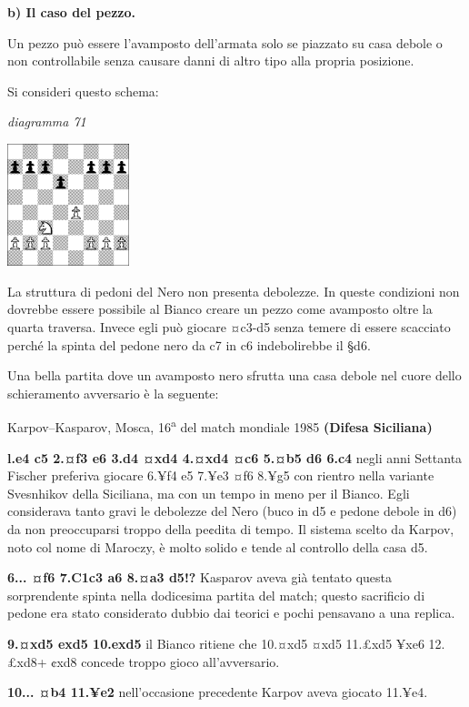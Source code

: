 \documentclass[
]{article}
\begin{document}
\textbf{b) Il caso del pezzo.}

Un pezzo può essere l'avamposto dell'armata solo se piazzato su casa
debole o non controllabile senza causare danni di altro tipo alla
propria posizione.

Si consideri questo schema:

\emph{diagramma 71}

\includegraphics[width=1.39792in,height=1.39792in]{vertopal_109f12be458a423d8f3cc838880eaea2/media/image71.png}

La struttura di pedoni del Nero non presenta debolezze. In queste
condizioni non dovrebbe essere possibile al Bianco creare un pezzo come
avamposto oltre la quarta traversa. Invece egli può giocare ¤c3-d5 senza
temere di essere scacciato perché la spinta del pedone nero da c7 in c6
indebolirebbe il §d6.

Una bella partita dove un avamposto nero sfrutta una casa debole nel
cuore dello schieramento avversario è la seguente:

Karpov--Kasparov, Mosca, 16\textsuperscript{a} del match mondiale 1985
\textbf{(Difesa Siciliana)}

\textbf{l.e4 c5 2.¤f3 e6 3.d4 ¤xd4 4.¤xd4 ¤c6 5.¤b5 d6 6.c4} negli anni
Settanta Fischer preferiva giocare 6.¥f4 e5 7.¥e3 ¤f6 8.¥g5 con rientro
nella variante Svesnhikov della Siciliana, ma con un tempo in meno per
il Bianco. Egli considerava tanto gravi le debolezze del Nero (buco in
d5 e pedone debole in d6) da non preoccuparsi troppo della pe¢dita di
tempo. Il sistema scelto da Karpov, noto col nome di Maroczy, è molto
solido e tende al controllo della casa d5.

\textbf{6... ¤f6 7.C1c3 a6 8.¤a3 d5!?} Kasparov aveva già tentato questa
sorprendente spinta nella dodicesima partita del match; questo
sacrificio di pedone era stato considerato dubbio dai teorici e pochi
pensavano a una replica.

\textbf{9.¤xd5 exd5 10.exd5} il Bianco ritiene che 10.¤xd5 ¤xd5 11.£xd5
¥xe6 12.£xd8+ ¢xd8 concede troppo gioco all'avversario.

\textbf{10... ¤b4 11.¥e2} nell'occasione precedente Karpov aveva giocato
11.¥e4.
\end{document}
